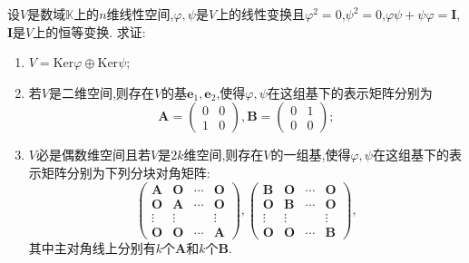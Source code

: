 \documentclass[../../main.tex]{subfiles}%
\begin{document}
\begin{example}
设\(V\)是数域\(\mathbb{K}\)上的\(n\)维线性空间,\(\varphi,\psi\)是\(V\)上的线性变换且\(\varphi^2 = 0\),\(\psi^2 = 0\),\(\varphi\psi+\psi\varphi=\boldsymbol{I}\),\(\boldsymbol{I}\)是\(V\)上的恒等变换. 求证:
\begin{enumerate}[(1)]
\item \(V=\text{Ker}\varphi\oplus\text{Ker}\psi\);

\item 若\(V\)是二维空间,则存在\(V\)的基\(\boldsymbol{e}_1,\boldsymbol{e}_2\),使得\(\varphi,\psi\)在这组基下的表示矩阵分别为
\[
\boldsymbol{A}=\begin{pmatrix}0&0\\1&0\end{pmatrix},\boldsymbol{B}=\begin{pmatrix}0&1\\0&0\end{pmatrix};
\]

\item \(V\)必是偶数维空间且若\(V\)是\(2k\)维空间,则存在\(V\)的一组基,使得\(\varphi,\psi\)在这组基下的表示矩阵分别为下列分块对角矩阵:
\[
\begin{pmatrix}
\boldsymbol{A}&\boldsymbol{O}&\cdots&\boldsymbol{O}\\
\boldsymbol{O}&\boldsymbol{A}&\cdots&\boldsymbol{O}\\
\vdots&\vdots&&\vdots\\
\boldsymbol{O}&\boldsymbol{O}&\cdots&\boldsymbol{A}
\end{pmatrix},\begin{pmatrix}
\boldsymbol{B}&\boldsymbol{O}&\cdots&\boldsymbol{O}\\
\boldsymbol{O}&\boldsymbol{B}&\cdots&\boldsymbol{O}\\
\vdots&\vdots&&\vdots\\
\boldsymbol{O}&\boldsymbol{O}&\cdots&\boldsymbol{B}
\end{pmatrix},
\]
其中主对角线上分别有\(k\)个\(\boldsymbol{A}\)和\(k\)个\(\boldsymbol{B}\).
\end{enumerate}
\end{example}
\end{document}
